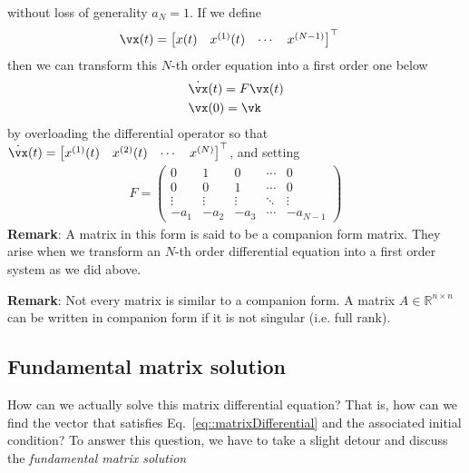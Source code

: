 \documentclass[a4paper,11pt]{exam}
\newcounter{ct}
\newcommand{\trp}{{^\top}} %
\newcommand{\field}[1]{\ensuremath{\mathbb{#1}}}
\newcommand{\reals}{\field{R}}
\begin{document}
\begin{questions}
without loss of generality $a_N = 1$.  If we define
\begin{align}
    \vx(t) &= \begin{bmatrix} x(t) & x^{(1)}(t) & \cdots & x^{(N-1)}\end{bmatrix}^\top
\end{align}
then we can transform this $N$-th order equation into a first order one below
\begin{align}\label{eq::matrixDifferential}
    &\dot{\vx}(t) = F \vx(t)\\
    &\vx(0) = \vk
\end{align}
by overloading the differential operator so that $\dot{\vx}(t) = \begin{bmatrix} x^{(1)}(t) & x^{(2)}(t) & \cdots & x^{(N)}\end{bmatrix}^\top
$, and setting
\begin{align}
    F = \begin{pmatrix} 0 & 1 & 0 & \cdots & 0 \\ 
                        0 & 0 & 1 & \cdots & 0 \\
                        \vdots & \vdots & \vdots & \ddots & \vdots\\
                        -a_1 & -a_2 & -a_3 & \cdots & -a_{N-1} \end{pmatrix}
\end{align}
\textbf{Remark}: A matrix in this form is said to be a companion form matrix.  They arise when we transform an $N$-th order differential equation into a first order system as we did above.

\textbf{Remark}: Not every matrix is similar to a companion form. A matrix $A \in \reals^{n \times n}$ can be written in companion form if it is not singular (i.e. full rank). 

\subsection{Fundamental matrix solution}
How can we actually solve this matrix differential equation? That is, how can we find the vector that satisfies Eq.~\eqref{eq::matrixDifferential} and the associated initial condition? To answer this question, we have to take a slight detour and discuss the \textit{fundamental matrix solution}


\end{questions}
\end{document}
